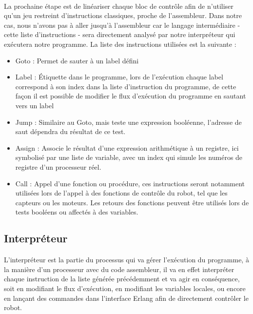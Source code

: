 \documentclass[a4paper]{article}
\begin{document}
\paragraph{}
La prochaine étape est de linéariser chaque bloc de contrôle afin de n’utiliser qu’un jeu restreint d’instructions classiques, proche de l’assembleur. Dans notre cas, nous n'avons pas à aller jusqu'à l’assembleur car le langage intermédiaire - cette liste d’instructions - sera directement analysé par notre interpréteur qui exécutera notre programme. La liste des instructions utilisées est la suivante :
\begin{itemize}
\item Goto : Permet de sauter à un label défini
\item Label : Étiquette dans le programme, lors de l'exécution chaque label correspond à son index dans la liste d’instruction du programme, de cette façon il est possible de modifier le flux d'exécution du programme en sautant vers un label
\item Jump : Similaire au Goto, mais teste une expression booléenne, l’adresse de saut dépendra du résultat de ce test.
\item Assign : Associe le résultat d’une expression arithmétique à un registre, ici symbolisé par une liste de variable, avec un index qui simule les numéros de registre d’un processeur réel.
\item Call : Appel d’une fonction ou procédure, ces instructions seront notamment utilisées lors de l’appel à des fonctions de contrôle du robot, tel que les capteurs ou les moteurs. Les retours des fonctions peuvent être utilisés lors de tests booléens ou affectés à des variables.
\end{itemize}

\subsection{Interpréteur}
\paragraph{}
L'interpréteur est la partie du processus qui va gérer l'exécution du programme, à la manière d’un processeur avec du code assembleur, il va en effet interpréter chaque instruction de la liste générée précédemment et va agir en conséquence, soit en modifiant le flux d'exécution, en modifiant les variables locales, ou encore en lançant des commandes dans l’interface Erlang afin de directement contrôler le robot.
\end{document}
